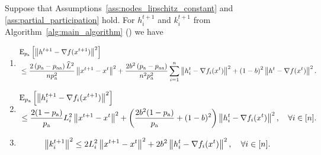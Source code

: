 \documentclass{article}
\newcommand{\algorithmname}{DARIA}
\newcommand*{\probavailable}{\ensuremath{p_{\textnormal{a}}}}
\newcommand*{\probpairaa}{\ensuremath{p_{\textnormal{aa}}}}
\begin{document}
\begin{lemma}
  \label{lemma:gradient}
  Suppose that Assumptions~\ref{ass:nodes_lipschitz_constant} and \ref{ass:partial_participation} hold. For $h^{t+1}_i$ and $k^{t+1}_i$ from Algorithm~\ref{alg:main_algorithm} (\algname{\algorithmname}) we have
  \begin{enumerate}
  \item
      \begin{align*}
          &\ExpSub{\probavailable}{\norm{h^{t+1} - \nabla f(x^{t+1})}^2} \\
          & \leq \frac{2\left(\probavailable - \probpairaa\right)\widehat{L}^2}{n \probavailable^2} \norm{x^{t+1} - x^{t}}^2 + \frac{2 b^2 \left(\probavailable - \probpairaa\right)}{n^2 \probavailable^2} \sum_{i=1}^n \norm{h^t_i - \nabla f_i(x^{t})}^2 + \left(1 - b\right)^2 \norm{h^{t} - \nabla f(x^{t})}^2.
      \end{align*}
  \item
      \begin{align*}
          &\ExpSub{\probavailable}{\norm{h^{t+1}_i - \nabla f_i(x^{t+1})}^2} \\
          & \leq \frac{2(1 - \probavailable)}{\probavailable} L^2_i \norm{x^{t+1} - x^{t}}^2 + \left(\frac{2 b^2 (1 - \probavailable)}{\probavailable} + (1 - b)^2\right) \norm{h^{t}_i - \nabla f_i(x^{t})}^2, \quad \forall i \in [n].
      \end{align*}
  \item
      \begin{align*}
        &\left\| k^{t+1}_i \right\|^2 \leq 2L^2_i\left\| x^{t+1} - x^{t} \right\|^2 + 2b^2 \left\| h^t_i - \nabla f_i(x^{t}) \right\|^2, \quad \forall i \in [n].
      \end{align*}
  \end{enumerate}
\end{lemma}
\end{document}
